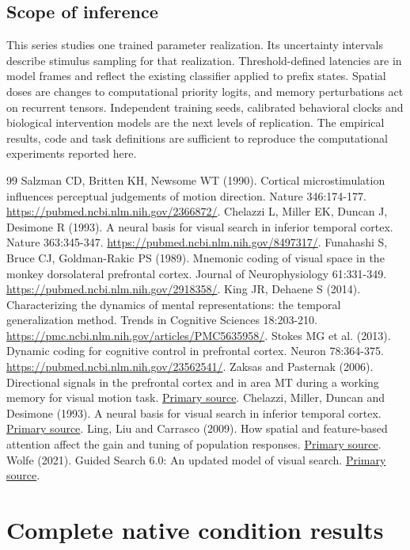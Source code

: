 \documentclass[11pt]{article}
\begin{document}
\subsection{Scope of inference}
This series studies one trained parameter realization. Its uncertainty intervals describe stimulus sampling for that realization. Threshold-defined latencies are in model frames and reflect the existing classifier applied to prefix states. Spatial doses are changes to computational priority logits, and memory perturbations act on recurrent tensors. Independent training seeds, calibrated behavioral clocks and biological intervention models are the next levels of replication. The empirical results, code and task definitions are sufficient to reproduce the computational experiments reported here.

\begin{thebibliography}{99}
 Salzman CD, Britten KH, Newsome WT (1990). Cortical microstimulation influences perceptual judgements of motion direction. Nature 346:174-177. \url{https://pubmed.ncbi.nlm.nih.gov/2366872/}.
 Chelazzi L, Miller EK, Duncan J, Desimone R (1993). A neural basis for visual search in inferior temporal cortex. Nature 363:345-347. \url{https://pubmed.ncbi.nlm.nih.gov/8497317/}.
 Funahashi S, Bruce CJ, Goldman-Rakic PS (1989). Mnemonic coding of visual space in the monkey dorsolateral prefrontal cortex. Journal of Neurophysiology 61:331-349. \url{https://pubmed.ncbi.nlm.nih.gov/2918358/}.
 King JR, Dehaene S (2014). Characterizing the dynamics of mental representations: the temporal generalization method. Trends in Cognitive Sciences 18:203-210. \url{https://pmc.ncbi.nlm.nih.gov/articles/PMC5635958/}.
 Stokes MG et al. (2013). Dynamic coding for cognitive control in prefrontal cortex. Neuron 78:364-375. \url{https://pubmed.ncbi.nlm.nih.gov/23562541/}.
 Zaksas and Pasternak (2006). Directional signals in the prefrontal cortex and in area MT during a working memory for visual motion task. \href{https://pubmed.ncbi.nlm.nih.gov/17093094/}{Primary source}.
 Chelazzi, Miller, Duncan and Desimone (1993). A neural basis for visual search in inferior temporal cortex. \href{https://pubmed.ncbi.nlm.nih.gov/8497317/}{Primary source}.
 Ling, Liu and Carrasco (2009). How spatial and feature-based attention affect the gain and tuning of population responses. \href{https://pmc.ncbi.nlm.nih.gov/articles/PMC2696585/}{Primary source}.
 Wolfe (2021). Guided Search 6.0: An updated model of visual search. \href{https://doi.org/10.3758/s13423-020-01859-9}{Primary source}.
\end{thebibliography}\clearpage\appendix\section{Complete native condition results}
\end{document}
